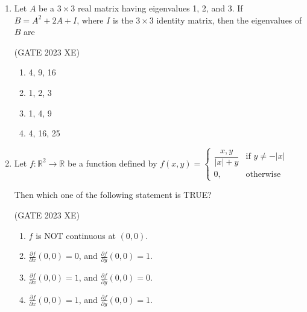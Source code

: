 \documentclass[journal,12pt,onecolumn]{IEEEtran}
\begin{document}
\begin{enumerate}

\item Let $A$ be a $3 \times 3$ real matrix having eigenvalues 1, 2, and 3. If $B= A^2 + 2A + I$,
where $I$ is the $3 \times 3$ identity matrix, then the eigenvalues of $B$ are

\hfill{(GATE 2023 XE)}

\begin{multicols}{2}

\begin{enumerate}

\item 4, 9, 16

\item 1, 2, 3

\item 1, 4, 9

\item 4, 16, 25

\end{enumerate}

\end{multicols}

\item Let $f: \mathbb{R}^2 \to \mathbb{R}$ be a function defined by
$f(x,y)=
\begin{cases}
\dfrac{x,y}{|x|+y} & \text{if } y\neq -|x| \\
0 , & \text{otherwise}
\end{cases}$

Then which one of the following statement is TRUE?

\hfill{(GATE 2023 XE)}

\begin{multicols}{2}

\begin{enumerate}

\item $f$ is NOT continuous at $(0,0)$.

\item $\frac{\partial f}{\partial x}(0,0) = 0$, and $\frac{\partial f}{\partial y}(0,0) = 1$.

\item $\frac{\partial f}{\partial x}(0,0) = 1$, and $\frac{\partial f}{\partial y}(0,0) = 0$.

\item $\frac{\partial f}{\partial x}(0,0) = 1$, and $\frac{\partial f}{\partial y}(0,0) = 1$.

\end{enumerate}


\end{multicols}
\end{enumerate}
\end{document}
